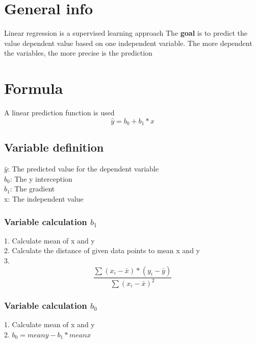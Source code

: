 \documentclass{article}
\begin{document}
\section{General info}
Linear regression is a supervised learning approach
The \textbf{goal} is to predict the value dependent value based on one independent variable. The more dependent the variables, 
the more precise is the prediction
\section{Formula}
A linear prediction function is used 
\begin{equation}
    \hat{y} = b_0 + b_1 * x
\end{equation}
\subsection{Variable definition}
$\hat{y}$: The predicted value for the dependent variable \\
$b_0$: The y interception \\
$b_1$: The gradient \\  
x: The independent value 
\subsubsection{Variable calculation $b_1$}
1. Calculate mean of x and y \\
2. Calculate the distance of given data points to mean x and y \\
3.
\begin{equation}
  \dfrac{\sum (x_i - \bar{x}) * (y_i - \bar{y}) }{\sum (x_i - \bar{x})^2}  
\end{equation}  
\subsubsection{Variable calculation $b_0$}
1. Calculate mean of x and y \\
2. $ b_0 = mean y - b_1 * mean x$
\end{document}
